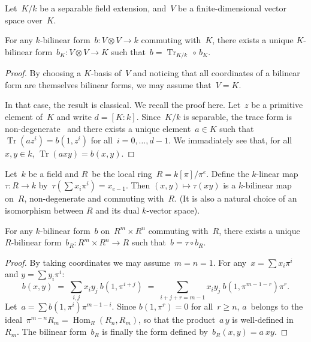 \documentclass{amsart}
\DeclareMathOperator\Hom{Hom}
\DeclareMathOperator\Tr{Tr}
\begin{document}
\begin{prop}\label{prop:trace-ext}
Let~$K/k$ be a separable field extension,
and~$V$ be a finite-dimensional vector space over~$K$.

For any $k$-bilinear form~$b: V ⊗ V → k$ commuting with~$K$, there
exists a unique $K$-bilinear form~$b_K: V ⊗ V → K$ such that~$b =
\Tr_{K/k} \,∘ \,b_K$.
\end{prop}
\begin{proof}
By choosing a $K$-basis of~$V$ and noticing that
all coordinates of a bilinear form are themselves bilinear forms,
we may assume that~$V = K$.

In that case, the result is classical. We recall the proof here.
Let~$z$ be a primitive element of~$K$ and write $d = [K:k]$.
Since~$K/k$ is separable, the trace form is
non-degenerate~\cite[VI~5.2]{lang-algebra}
and there exists a unique element~$a ∈ K$ such that
$\Tr (a z^i) = b(1, z^i)$ for all~$i=0, …, d-1$.
We immadiately see that, for all~$x, y ∈ k$, $\Tr (a x y) = b(x, y)$.

\end{proof}

Let~$k$ be a field and $R$~be the local ring~$R = k[π]/π^e$.
Define the $k$-linear map~$τ: R → k$ by~$τ(∑ x_i π^i) = x_{e-1}$.
Then $(x, y) ↦ τ(xy)$ is a $k$-bilinear map on~$R$,
non-degenerate and commuting with~$R$.
(It is also a natural choice of an isomorphism
between $R$ and its dual $k$-vector space).

\begin{prop}\label{prop:trace-local}
For any $k$-bilinear form~$b$ on~$R^m × R^n$ commuting with~$R$,
there exists a unique $R$-bilinear form~$b_R: R^m × R^n → R$
such that~$b = τ ∘ b_R$.
\end{prop}
\begin{proof}
By taking coordinates we may assume~$m=n=1$.
For any~$x = ∑ x_i π^i$ and $y = ∑ y_i π^i$:
\begin{equation}
b(x,y) \;=\; ∑_{i,j} x_i y_j\: b(1, π^{i+j})
  \;=\; ∑_{i+j+r = m-1} x_i y_j\: b(1, π^{m-1-r}) π^r.
\end{equation}
Let~$a = ∑ b(1, π^{i}) π^{m-1-i}$. Since $b(1, π^{r}) = 0$ for all~$r ≥
n$, $a$~belongs to the ideal~$π^{m-n} R_m = \Hom_R (R_n, R_m)$, so that
the product~$a\,y$ is well-defined in~$R_m$. The bilinear form~$b_R$ is
finally the form defined by~$b_R(x,y) = a\:x y$.
\end{proof}
\end{document}
